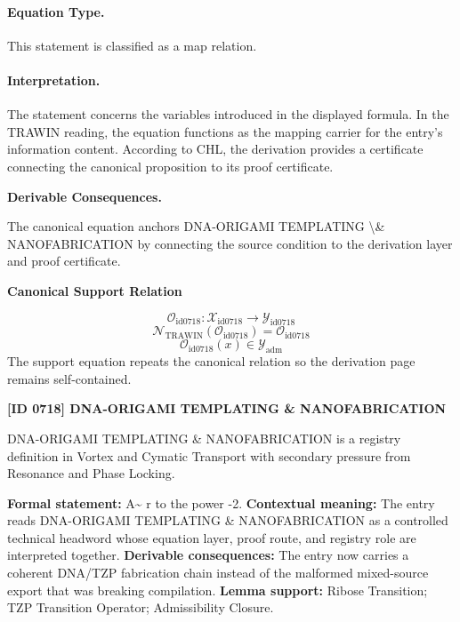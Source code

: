 \paragraph{Equation Type.}
This statement is classified as a map relation.

\paragraph{Interpretation.}
The statement concerns the variables introduced in the displayed formula. In the TRAWIN reading, the equation functions as the mapping carrier for the entry’s information content. According to CHL, the derivation provides a certificate connecting the canonical proposition to its proof certificate.

\par\vspace{0.35em}
\noindent\textbf{Derivable Consequences.}\quad
\begingroup
\footnotesize
\raggedright
The canonical equation anchors DNA-ORIGAMI TEMPLATING \textbackslash{}\& NANOFABRICATION by connecting the source condition to the derivation layer and proof certificate.
\par\endgroup

\noindent\textbf{Canonical Support Relation}\par
\[
\mathcal{O}_{\mathrm{id0718}}:\mathcal{X}_{\mathrm{id0718}}\longrightarrow\mathcal{Y}_{\mathrm{id0718}}
\]
\[
\mathcal{N}_{\mathrm{TRAWIN}}(\mathcal{O}_{\mathrm{id0718}})=\mathcal{O}_{\mathrm{id0718}}
\]
\[
\mathcal{O}_{\mathrm{id0718}}(x)\in\mathcal{Y}_{\mathrm{adm}}
\]
\noindent The support equation repeats the canonical relation so the derivation page remains self-contained.\par

\clearpage
\noindent\textbf{[ID 0718] DNA-ORIGAMI TEMPLATING \& NANOFABRICATION}\par
\vspace{0.35em}
\begingroup\small
{}
DNA-ORIGAMI TEMPLATING \& NANOFABRICATION is a registry definition in Vortex and Cymatic Transport with secondary pressure from Resonance and Phase Locking.

\begingroup\footnotesize\setlength{\emergencystretch}{3em}\sloppy
\textbf{Formal statement:} A\textasciitilde{} r to the power -2. \textbf{Contextual meaning:} The entry reads DNA-ORIGAMI TEMPLATING \& NANOFABRICATION as a controlled technical headword whose equation layer, proof route, and registry role are interpreted together. \textbf{Derivable consequences:} The entry now carries a coherent DNA/TZP fabrication chain instead of the malformed mixed-source export that was breaking compilation. \textbf{Lemma support:} Ribose Transition; TZP Transition Operator; Admissibility Closure.\par
\endgroup

